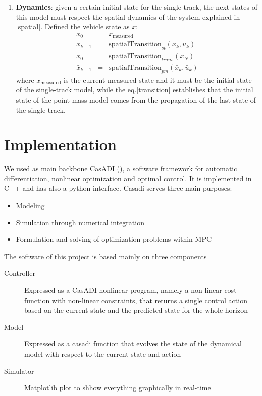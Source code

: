 \documentclass[a4paper, onecolumn, 11pt]{article}
\begin{document}
\begin{enumerate}
    \item \textbf{Dynamics}: given a certain initial state for the single-track, the next states of this model must respect the
    spatial dynamics of the system explained in \ref{spatial}. Defined the vehicle state as $x$:
    \begin{eqnarray}
        x_0 &=& x_{\text{measured}} \\
        x_{k+1} &=& \text{spatialTransition}_{st}(x_k, u_k) \\
        \bar{x}_0 &=& \text{spatialTransition}_{trans}(x_N) \label{transition}\\
        \bar{x}_{k+1} &=& \text{spatialTransition}_{pm}(\bar{x}_k, \bar{u}_k)
    \end{eqnarray}
    where $x_{\text{measured}}$ is the current measured state and it must be the initial state of the single-track model,
    while the eq.\ref{transition} establishes that the initial state of the point-mass model comes from the propagation of 
    the last state of the single-track.
\end{enumerate}


\section{Implementation}
We used as main backbone CasADI (\cite{casadi}), a software framework for automatic
differentiation, nonlinear optimization and optimal control. It is implemented
in C++ and has also a python interface. Casadi serves three main purposes:
\begin{itemize}
    \item Modeling
    \item Simulation through numerical integration
    \item Formulation and solving of optimization problems within MPC
\end{itemize}
The software of this project is based mainly on three components
\begin{description}
    \item[Controller] Expressed as a CasADI nonlinear program, namely a non-linear cost
    function with non-linear constraints, that returns a single control action
    based on the current state and the predicted state for the whole horizon
    \item[Model] Expressed as a casadi function that evolves the
    state of the dynamical model with respect to the current state and action
    \item[Simulator] Matplotlib plot to shhow everything graphically in real-time
\end{description}
\end{document}
